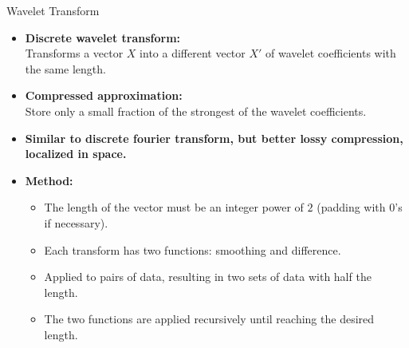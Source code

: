 \begin{frame}{Wavelet Transform}
	\begin{itemize}
		\item \textbf{Discrete wavelet transform:}\\
		      Transforms a vector $X$ into a different vector $X'$ of wavelet
		      coefficients with the same length.
		\item \textbf{Compressed approximation:}\\
		      Store only a small fraction of the strongest of the wavelet
		      coefficients.
		\item \textbf{Similar to discrete fourier transform, but better lossy
			      compression, localized in space.}
		\item \textbf{Method:}
		      \begin{itemize}
			      \item The length of the vector must be an integer power of $2$
			            (padding with $0$'s if necessary).
			      \item Each transform has two functions: smoothing and difference.
			      \item Applied to pairs of data, resulting in two sets of data with
			            half the length.
			      \item The two functions are applied recursively until reaching the
			            desired length.
		      \end{itemize}
	\end{itemize}
\end{frame}

